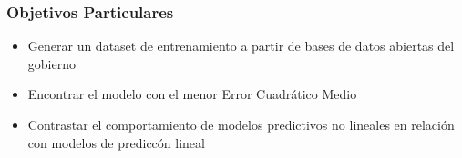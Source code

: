 \subsubsection{Objetivos Particulares}
\begin{itemize}
    \item Generar un dataset de entrenamiento a partir de bases de datos abiertas del gobierno
    \item Encontrar el modelo con el menor Error Cuadr\'atico Medio
    \item Contrastar el comportamiento de modelos predictivos no lineales en relaci\'on con modelos de predicc\'on lineal
    \end{itemize}